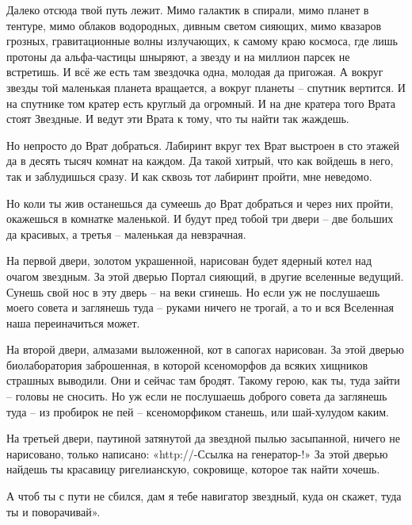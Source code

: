 \documentclass[ebook,oneside,final,openright]{memoir}
\begin{document}
\par
Далеко отсюда твой путь лежит. Мимо галактик в спирали, мимо планет в тентуре, мимо облаков водородных, дивным светом сияющих, мимо квазаров грозных, гравитационные волны излучающих, к самому краю космоса, где лишь протоны да альфа-частицы шныряют, а звезду и на миллион парсек не встретишь. И всё же есть там звездочка одна, молодая да пригожая. А вокруг звезды той маленькая планета вращается, а вокруг планеты – спутник вертится. И на спутнике том кратер есть круглый да огромный. И на дне кратера того Врата стоят Звездные. И ведут эти Врата к тому, что ты найти так жаждешь.\par
\par
Но непросто до Врат добраться. Лабиринт вкруг тех Врат выстроен в сто этажей да в десять тысяч комнат на каждом. Да такой хитрый, что как войдешь в него, так и заблудишься сразу. И как сквозь тот лабиринт пройти, мне неведомо.\par
\par
Но коли ты жив останешься да сумеешь до Врат добраться и через них пройти, окажешься в комнатке маленькой. И будут пред тобой три двери – две больших да красивых, а третья – маленькая да невзрачная.\par
\par
На первой двери, золотом украшенной, нарисован будет ядерный котел над очагом звездным. За этой дверью Портал сияющий, в другие вселенные ведущий. Сунешь свой нос в эту дверь – на веки сгинешь. Но если уж не послушаешь моего совета и заглянешь туда – руками ничего не трогай, а то и вся Вселенная наша переиначиться может.\par
\par
На второй двери, алмазами выложенной, кот в сапогах нарисован. За этой дверью биолаборатория заброшенная, в которой ксеноморфов да всяких хищников страшных выводили. Они и сейчас там бродят. Такому герою, как ты, туда зайти – головы не сносить. Но уж если не послушаешь доброго совета да заглянешь туда – из пробирок не пей – ксеноморфиком станешь, или шай-хулудом каким.\par
\par
На третьей двери, паутиной затянутой да звездной пылью засыпанной, ничего не нарисовано, только написано: «http://-Ссылка на генератор-!» За этой дверью найдешь ты красавицу ригелианскую, сокровище, которое так найти хочешь.\par
\par
А чтоб ты с пути не сбился, дам я тебе навигатор звездный, куда он скажет, туда ты и поворачивай».\par
\end{document}
